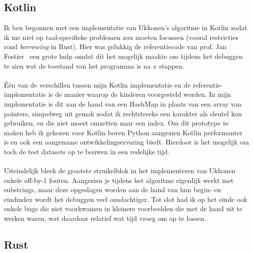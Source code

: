 \subsection{Kotlin}\label{subsec:kotlin}
Ik ben begonnen met een implementatie van Ukkonen's algoritme in Kotlin zodat ik me niet op taal-specifieke problemen zou moeten focussen (vooral restricties rond \textit{borrowing} in Rust).
Hier was gelukkig de referentiecode van prof. Jan Fostier~\cite{Ukkonen_CCB} een grote hulp omdat dit het mogelijk maakte om tijdens het debuggen te zien wat de toestand van het programma is na $x$ stappen.
\\ \\
Één van de verschillen tussen mijn Kotlin implementatie en de referentie-implementatie is de manier waarop de kinderen voorgesteld worden.
In mijn implementatie is dit aan de hand van een HashMap in plaats van een array van pointers, simpelweg uit gemak zodat ik rechtstreeks een karakter als sleutel kon gebruiken, en die niet moest omzetten naar een index.
Om dit prototype te maken heb ik gekozen voor Kotlin boven Python aangezien Kotlin performanter is en ook een aangename ontwikkelingservaring biedt.
Hierdoor is het mogelijk om toch de test datasets op te bouwen in een redelijke tijd.
\\ \\
Uiteindelijk bleek de grootste struikelblok in het implementeren van Ukkonen enkele off-by-1 fouten.
Aangezien je tijdens het algoritme eigenlijk werkt met substrings, maar deze opgeslagen worden aan de hand van hun begin- en eindindex wordt het debuggen veel omslachtiger.
Tot slot had ik op het einde ook enkele bugs die niet voorkwamen in kleinere voorbeelden die met de hand uit te werken waren, wat daardoor relatief wat tijd vroeg om op te lossen.

\subsection{Rust}\label{subsec:rust}

